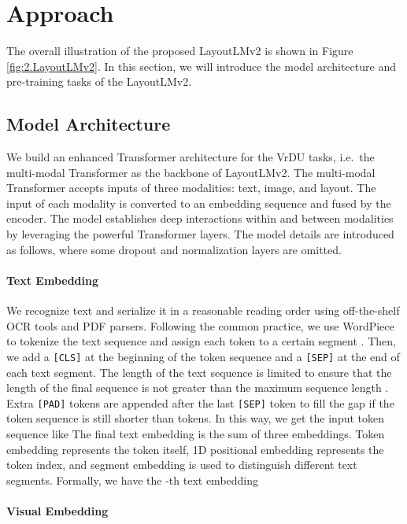\documentclass{article} \usepackage{iclr2021_conference,times}
\begin{document}
\section{Approach}

The overall illustration of the proposed LayoutLMv2 is shown in Figure \ref{fig:2.LayoutLMv2}. In this section, we will introduce the model architecture and pre-training tasks of the LayoutLMv2.

\subsection{Model Architecture}

We build an enhanced Transformer architecture for the VrDU tasks, i.e.\ the multi-modal Transformer as the backbone of LayoutLMv2. The multi-modal Transformer accepts inputs of three modalities: text, image, and layout. The input of each modality is converted to an embedding sequence and fused by the encoder. The model establishes deep interactions within and between modalities by leveraging the powerful Transformer layers. The model details are introduced as follows, where some dropout and normalization layers are omitted.


\paragraph{Text Embedding}

We recognize text and serialize it in a reasonable reading order using off-the-shelf OCR tools and PDF parsers.
Following the common practice, we use WordPiece \citep{wu2016google} to tokenize the text sequence and assign each token to a certain segment . Then, we add a {\tt[CLS]} at the beginning of the token sequence and a {\tt[SEP]} at the end of each text segment. The length of the text sequence is limited to ensure that the length of the final sequence is not greater than the maximum sequence length . Extra {\tt[PAD]} tokens are appended after the last {\tt[SEP]} token to fill the gap if the token sequence is still shorter than  tokens.
In this way, we get the input token sequence like 
The final text embedding is the sum of three embeddings. Token embedding represents the token itself, 1D positional embedding represents the token index, and segment embedding is used to distinguish different text segments. Formally, we have the -th text embedding 

\paragraph{Visual Embedding}
\end{document}
